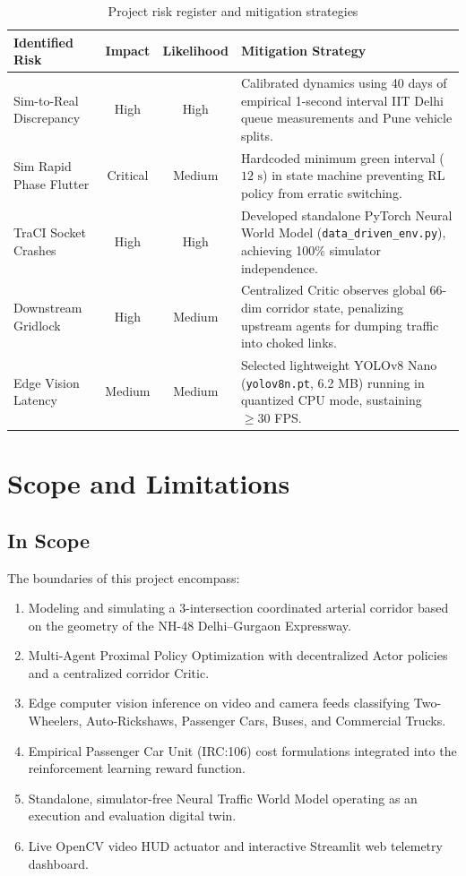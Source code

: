 \documentclass[12pt,a4paper,oneside]{report}
\begin{document}
\begin{table}[htbp]
\centering
\small
\caption{Project risk register and mitigation strategies}
\label{tab:risk_register}
\begin{tabularx}{\textwidth}{|p{3.2cm}|c|c|X|}
\hline
\textbf{Identified Risk} & \textbf{Impact} & \textbf{Likelihood} & \textbf{Mitigation Strategy} \\ \hline
Sim-to-Real Discrepancy & High & High & Calibrated dynamics using 40 days of empirical 1-second interval IIT Delhi queue measurements and Pune vehicle splits. \\ \hline
Sim Rapid Phase Flutter & Critical & Medium & Hardcoded minimum green interval ($12\text{ s}$) in state machine preventing RL policy from erratic switching. \\ \hline
TraCI Socket Crashes & High & High & Developed standalone PyTorch Neural World Model (\texttt{data\_driven\_env.py}), achieving 100\% simulator independence. \\ \hline
Downstream Gridlock & High & Medium & Centralized Critic observes global 66-dim corridor state, penalizing upstream agents for dumping traffic into choked links. \\ \hline
Edge Vision Latency & Medium & Medium & Selected lightweight YOLOv8 Nano (\texttt{yolov8n.pt}, 6.2 MB) running in quantized CPU mode, sustaining $\ge 30$ FPS. \\ \hline
\end{tabularx}
\end{table}

\section{Scope and Limitations}
\label{sec:scope_limitations}

\subsection{In Scope}
The boundaries of this project encompass:
\begin{enumerate}
    \item Modeling and simulating a 3-intersection coordinated arterial corridor based on the geometry of the NH-48 Delhi--Gurgaon Expressway.
    \item Multi-Agent Proximal Policy Optimization with decentralized Actor policies and a centralized corridor Critic.
    \item Edge computer vision inference on video and camera feeds classifying Two-Wheelers, Auto-Rickshaws, Passenger Cars, Buses, and Commercial Trucks.
    \item Empirical Passenger Car Unit (IRC:106) cost formulations integrated into the reinforcement learning reward function.
    \item Standalone, simulator-free Neural Traffic World Model operating as an execution and evaluation digital twin.
    \item Live OpenCV video HUD actuator and interactive Streamlit web telemetry dashboard.
\end{enumerate}
\end{document}
